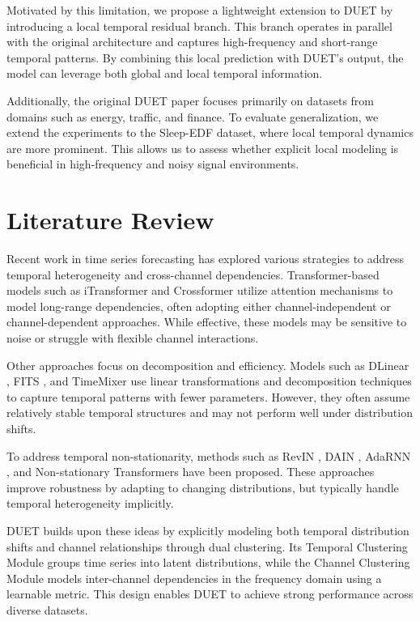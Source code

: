 \documentclass[conference]{IEEEtran}
\begin{document}
Motivated by this limitation, we propose a lightweight extension to DUET by introducing a local temporal residual branch. This branch operates in parallel with the original architecture and captures high-frequency and short-range temporal patterns. By combining this local prediction with DUET’s output, the model can leverage both global and local temporal information.

Additionally, the original DUET paper focuses primarily on datasets from domains such as energy, traffic, and finance. To evaluate generalization, we extend the experiments to the Sleep-EDF dataset, where local temporal dynamics are more prominent. This allows us to assess whether explicit local modeling is beneficial in high-frequency and noisy signal environments.

\section{Literature Review}
Recent work in time series forecasting has explored various strategies to address temporal heterogeneity and cross-channel dependencies. Transformer-based models such as  iTransformer  \cite{informer} and Crossformer \cite{crossformer} utilize attention mechanisms to model long-range dependencies, often adopting either channel-independent or channel-dependent approaches. While effective, these models may be sensitive to noise or struggle with flexible channel interactions.

Other approaches focus on decomposition and efficiency. Models such as DLinear \cite{dlinear}, FITS \cite{FITS}, and TimeMixer \cite{timemixer} use linear transformations and decomposition techniques to capture temporal patterns with fewer parameters. However, they often assume relatively stable temporal structures and may not perform well under distribution shifts.

To address temporal non-stationarity, methods such as RevIN \cite{revin}, DAIN \cite{dain}, AdaRNN \cite{adaRNN}, and Non-stationary Transformers \cite{nstransformer} have been proposed. These approaches improve robustness by adapting to changing distributions, but typically handle temporal heterogeneity implicitly.

DUET builds upon these ideas by explicitly modeling both temporal distribution shifts and channel relationships through dual clustering. Its Temporal Clustering Module groups time series into latent distributions, while the Channel Clustering Module models inter-channel dependencies in the frequency domain using a learnable metric. This design enables DUET to achieve strong performance across diverse datasets.
\end{document}
